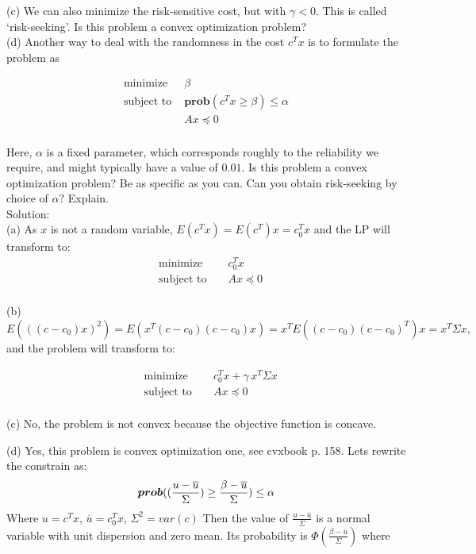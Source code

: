 \documentclass{article}
\begin{document}
(c) We can also minimize the risk-sensitive cost, but with $
\gamma < 0.$ This is called `risk-seeking'. Is this problem a convex optimization problem? \\

(d) Another way to deal with the randomness in the cost $c^T x$ is to formulate the problem as 

\begin{align*}
\text{minimize } &\beta \\
\text{subject to } &\boldsymbol{prob}(c^T x \geq \beta ) \leq \alpha \\
&A x \preceq 0 \\
\end{align*} 

Here, $\alpha$ is a fixed parameter, which corresponds roughly to the reliability we require, and might typically have a value of $0.01$. Is this problem a convex optimization problem? Be as specific as you can. Can you obtain risk-seeking by choice of $\alpha?$ Explain. \\

Solution: \\

(a) As $x$ is not a random variable, $E(c^T x) = E(c^T) x = c_0^T x$
and the LP will transform to:
\begin{align*}
&\text{minimize } &&c_0^T x \\
&\text{subject to } &&A x \preceq 0 \\
\end{align*} 

(b) $E(((c - c_0)x)^2) = E(x^T(c - c_0)(c - c_0) x) = 
x^TE((c - c_0)(c - c_0)^T)x = x^T \Sigma x,$ and the problem will transform to:

\begin{align*}
&\text{minimize } &&c_0^T x + \gamma \, x^T \Sigma x \\
&\text{subject to } &&A x \preceq 0 \\
\end{align*} 

(c) No, the problem is not convex because the objective function is concave.

(d)
Yes, this problem is convex optimization one,  see cvxbook p. 158. Lets rewrite the constrain as:
$$
\boldsymbol{prob}((\frac{u - \overline u}{\Sigma}) \geq 
\frac{\beta - \overline u}{\Sigma} ) \leq \alpha \\
$$
Where $u = c^T x$, $\overline u = c_0^Tx$, $\Sigma^2 = var(c)$
Then the value of $\frac{u - \overline u}{\Sigma}$ is a normal variable with unit dispersion and zero mean. Its probability is $\Phi(\frac{\beta - \overline u}{\Sigma})$ where
\end{document}
